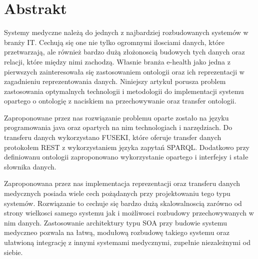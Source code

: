 \section{Abstrakt}
\label{sec:Abstrakt}

Systemy medyczne należą do jednych z najbardziej rozbudowanych systemów w branży IT. Cechują się one nie tylko ogromnymi ilosciami danych, które przetwarzają, ale również bardzo dużą złożonoscią budowych tych danych oraz relacji, które między nimi zachodzą. Własnie branża e-health jako jedna z pierwszych zainteresowała się zastosowaniem ontologii oraz ich reprezentacji w zagadnieniu reprezentowania danych. \cite{7} Niniejszy artykuł porusza problem zastosowania optymalnych technologii i metodologii do implementacji systemu opartego o ontologię z naciskiem na przechowywanie oraz transfer ontologii.

Zaproponowane przez nas rozwiązanie problemu oparte zostało na języku programowania java oraz opartych na nim technologiach i narzędziach. Do transferu danych wykorzystano FUSEKI, które oferuje transfer danych protokołem REST z wykorzystaniem języka zapytań SPARQL. Dodatkowo przy definiowanu ontologii zaproponowano wykorzystanie opartego i interfejsy i stałe słownika danych.

Zaproponowana przez nas implementacja reprezentacji oraz transferu danych medycznych posiada wiele cech pożądanych przy projektowaniu tego typu systemów. Rozwiązanie to cechuje się bardzo dużą skalowalnoscią zarówno od strony wielkosci samego systemu jak i możliwosci rozbudowy przechowywanych w nim danych. \cite{6} Zastosowanie architektury typu SOA przy budowie systemu medyczneo pozwala na łatwą, modułową rozbudowę takiego systemu oraz ułatwioną integrację z innymi systemami medycznymi, zupełnie niezależnymi od siebie.

